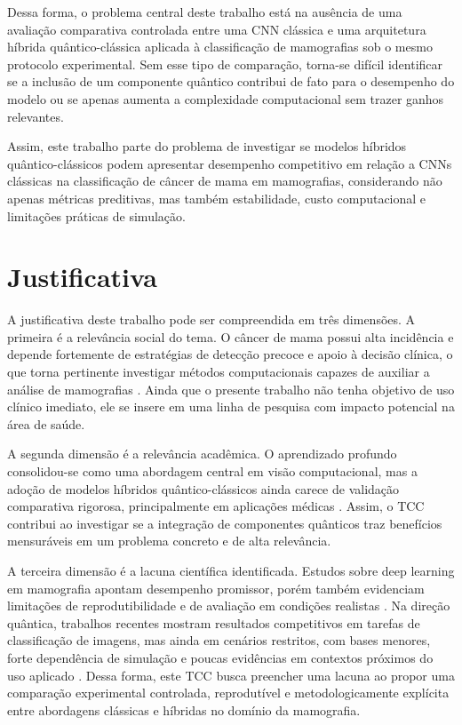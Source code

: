 \documentclass[
    12pt,
    openright,
    oneside,
    a4paper,
    english,
    brazil
]{abntex2}
\begin{document}
Dessa forma, o problema central deste trabalho está na ausência de uma avaliação comparativa controlada entre uma CNN clássica e uma arquitetura híbrida quântico-clássica aplicada à classificação de mamografias sob o mesmo protocolo experimental. Sem esse tipo de comparação, torna-se difícil identificar se a inclusão de um componente quântico contribui de fato para o desempenho do modelo ou se apenas aumenta a complexidade computacional sem trazer ganhos relevantes.

Assim, este trabalho parte do problema de investigar se modelos híbridos quântico-clássicos podem apresentar desempenho competitivo em relação a CNNs clássicas na classificação de câncer de mama em mamografias, considerando não apenas métricas preditivas, mas também estabilidade, custo computacional e limitações práticas de simulação.

\section{Justificativa}

A justificativa deste trabalho pode ser compreendida em três dimensões. A primeira é a relevância social do tema. O câncer de mama possui alta incidência e depende fortemente de estratégias de detecção precoce e apoio à decisão clínica, o que torna pertinente investigar métodos computacionais capazes de auxiliar a análise de mamografias \cite{WHO2025BreastCancer}. Ainda que o presente trabalho não tenha objetivo de uso clínico imediato, ele se insere em uma linha de pesquisa com impacto potencial na área de saúde.

A segunda dimensão é a relevância acadêmica. O aprendizado profundo consolidou-se como uma abordagem central em visão computacional, mas a adoção de modelos híbridos quântico-clássicos ainda carece de validação comparativa rigorosa, principalmente em aplicações médicas \cite{LeCun2015,Gupta2025QMLDigitalHealth}. Assim, o TCC contribui ao investigar se a integração de componentes quânticos traz benefícios mensuráveis em um problema concreto e de alta relevância.

A terceira dimensão é a lacuna científica identificada. Estudos sobre deep learning em mamografia apontam desempenho promissor, porém também evidenciam limitações de reprodutibilidade e de avaliação em condições realistas \cite{Bhalla2023MammographyReview}. Na direção quântica, trabalhos recentes mostram resultados competitivos em tarefas de classificação de imagens, mas ainda em cenários restritos, com bases menores, forte dependência de simulação e poucas evidências em contextos próximos do uso aplicado \cite{Long2025QCQCNN}. Dessa forma, este TCC busca preencher uma lacuna ao propor uma comparação experimental controlada, reprodutível e metodologicamente explícita entre abordagens clássicas e híbridas no domínio da mamografia.
\end{document}
